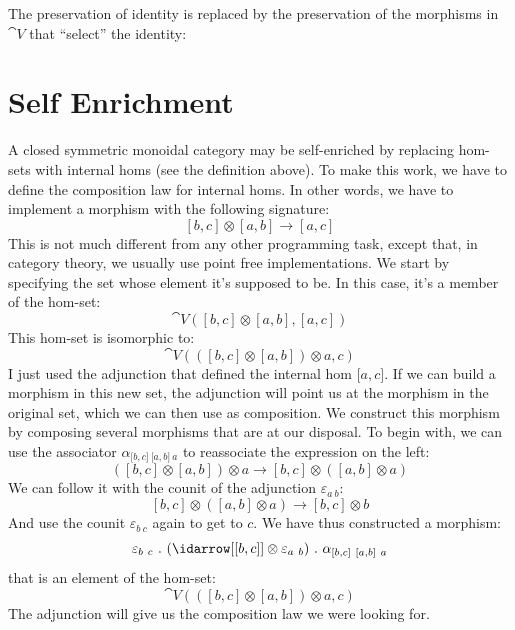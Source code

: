 \begin{figure}[H]
\centering
{}
\end{figure}

\noindent
The preservation of identity is replaced by the preservation of the
morphisms in $\cat{V}$ that ``select'' the identity:

\begin{figure}[H]
\centering
{}
\end{figure}

\section{Self Enrichment}

A closed symmetric monoidal category may be self-enriched by replacing
hom-sets with internal homs (see the definition above). To make this
work, we have to define the composition law for internal homs. In other
words, we have to implement a morphism with the following signature:
\[[b, c] \otimes [a, b] \to [a, c]\]
This is not much different from any other programming task, except that,
in category theory, we usually use point free implementations. We start
by specifying the set whose element it's supposed to be. In this case,
it's a member of the hom-set:
\[\cat{V}([b, c] \otimes [a, b], [a, c])\]
This hom-set is isomorphic to:
\[\cat{V}(([b, c] \otimes [a, b]) \otimes a, c)\]
I just used the adjunction that defined the internal hom
${[}a, c{]}$. If we can build a morphism in this new set, the
adjunction will point us at the morphism in the original set, which we
can then use as composition. We construct this morphism by composing
several morphisms that are at our disposal. To begin with, we can use
the associator $\alpha_{{[}b, c{]}\ {[}a, b{]}\ a}$ to reassociate the
expression on the left:
\[([b, c] \otimes [a, b]) \otimes a \to [b, c] \otimes ([a, b] \otimes a)\]
We can follow it with the counit of the adjunction $\varepsilon_{a\ b}$:
\[[b, c] \otimes ([a, b] \otimes a) \to [b, c] \otimes b\]
And use the counit $\varepsilon_{b\ c}$ again to get to $c$. We have
thus constructed a morphism:
\[\varepsilon_{b\ c}\ .\ (\idarrow[{[b, c]}] \otimes \varepsilon_{a\ b})\ .\ \alpha_{[b, c]\ [a, b]\ a}\]
that is an element of the hom-set:
\[\cat{V}(([b, c] \otimes [a, b]) \otimes a, c)\]
The adjunction will give us the composition law we were looking for.

